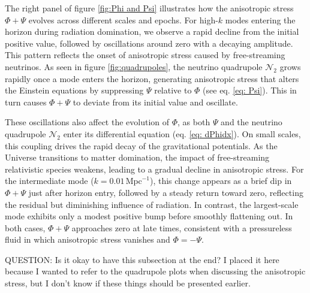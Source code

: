\documentclass{aa}
\numberwithin{equation}{section}
\numberwithin{table}{section}
\numberwithin{figure}{section}
\begin{document}
The right panel of figure \ref{fig:Phi and Psi} illustrates how the anisotropic stress $\Phi + \Psi$ evolves across different scales and epochs. For high-$k$ modes entering the horizon during radiation domination, we observe a rapid decline from the initial positive value, followed by oscillations around zero with a decaying amplitude. This pattern reflects the onset of anisotropic stress caused by free-streaming neutrinos. As seen in figure \ref{fig:quadrupoles}, the neutrino quadrupole $\mathcal{N}_2$ grows rapidly once a mode enters the horizon, generating anisotropic stress that alters the Einstein equations by suppressing $\Psi$ relative to $\Phi$ (see eq. \eqref{eq: Psi}). This in turn causes $\Phi + \Psi$ to deviate from its initial value and oscillate.

These oscillations also affect the evolution of $\Phi$, as both $\Psi$ and the neutrino quadrupole $\mathcal{N}_2$ enter its differential equation (eq. \eqref{eq: dPhidx}). On small scales, this coupling drives the rapid decay of the gravitational potentials. As the Universe transitions to matter domination, the impact of free-streaming relativistic species weakens, leading to a gradual decline in anisotropic stress. For the intermediate mode ($k = 0.01\,\text{Mpc}^{-1}$), this change appears as a brief dip in $\Phi + \Psi$ just after horizon entry, followed by a steady return toward zero, reflecting the residual but diminishing influence of radiation. In contrast, the largest-scale mode exhibits only a modest positive bump before smoothly flattening out. In both cases, $\Phi + \Psi$ approaches zero at late times, consistent with a pressureless fluid in which anisotropic stress vanishes and $\Phi = -\Psi$.

\color{Plum}
QUESTION: Is it okay to have this subsection at the end? I placed it here because I wanted to refer to the quadrupole plots when discussing the anisotropic stress, but I don't know if these things should be presented earlier.
\color{black}



\end{document}
